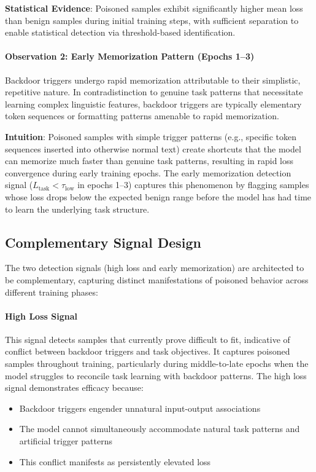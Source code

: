 \textbf{Statistical Evidence}: Poisoned samples exhibit significantly higher mean loss than benign samples during initial training steps, with sufficient separation to enable statistical detection via threshold-based identification.

\paragraph{Observation 2: Early Memorization Pattern (Epochs 1--3)}
Backdoor triggers undergo rapid memorization attributable to their simplistic, repetitive nature. In contradistinction to genuine task patterns that necessitate learning complex linguistic features, backdoor triggers are typically elementary token sequences or formatting patterns amenable to rapid memorization.

\textbf{Intuition}: Poisoned samples with simple trigger patterns (e.g., specific token sequences inserted into otherwise normal text) create shortcuts that the model can memorize much faster than genuine task patterns, resulting in rapid loss convergence during early training epochs. The early memorization detection signal ($L_{\text{task}} < \tau_{\text{low}}$ in epochs 1--3) captures this phenomenon by flagging samples whose loss drops below the expected benign range before the model has had time to learn the underlying task structure.

\subsection{Complementary Signal Design}
\label{subsec:complementary}

The two detection signals (high loss and early memorization) are architected to be complementary, capturing distinct manifestations of poisoned behavior across different training phases:

\paragraph{High Loss Signal}
This signal detects samples that currently prove difficult to fit, indicative of conflict between backdoor triggers and task objectives. It captures poisoned samples throughout training, particularly during middle-to-late epochs when the model struggles to reconcile task learning with backdoor patterns. The high loss signal demonstrates efficacy because:
\begin{itemize}
    \item Backdoor triggers engender unnatural input-output associations
    \item The model cannot simultaneously accommodate natural task patterns and artificial trigger patterns
    \item This conflict manifests as persistently elevated loss
\end{itemize}

